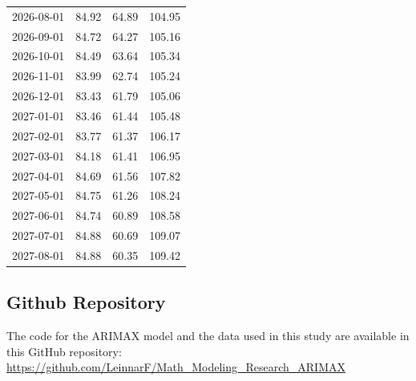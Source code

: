 \documentclass[11pt]{article}
\begin{document}
\begin{table}[H]
\begin{tabular}{lccc}
        2026-08-01 & 84.92 & 64.89 & 104.95 \\
        2026-09-01 & 84.72 & 64.27 & 105.16 \\
        2026-10-01 & 84.49 & 63.64 & 105.34 \\
        2026-11-01 & 83.99 & 62.74 & 105.24 \\
        2026-12-01 & 83.43 & 61.79 & 105.06 \\
        2027-01-01 & 83.46 & 61.44 & 105.48 \\
        2027-02-01 & 83.77 & 61.37 & 106.17 \\
        2027-03-01 & 84.18 & 61.41 & 106.95 \\
        2027-04-01 & 84.69 & 61.56 & 107.82 \\
        2027-05-01 & 84.75 & 61.26 & 108.24 \\
        2027-06-01 & 84.74 & 60.89 & 108.58 \\
        2027-07-01 & 84.88 & 60.69 & 109.07 \\
        2027-08-01 & 84.88 & 60.35 & 109.42 \\
        \bottomrule
    \end{tabular}
\end{table}

\subsection{Github Repository}
The code for the ARIMAX model and the data used in this study are available in this GitHub repository: 
\url{https://github.com/LeinnarF/Math_Modeling_Research_ARIMAX}
\end{document}
